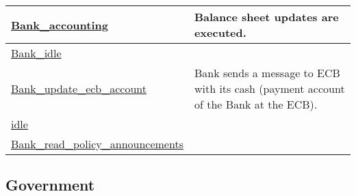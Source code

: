 \documentclass[a4paper,11pt]{article}
\begin{document}
\begin{landscape}
\begin{longtable}[H!]{ll}
\midrule
\url{Bank_accounting} \index{\url{Bank_accounting}} & \parbox{10cm}{Balance sheet updates are executed.} \\
\midrule
\url{Bank_idle}  & \parbox{10cm}{} \\
\midrule
\url{Bank_update_ecb_account}  & \parbox{10cm}{Bank sends a message to ECB with its cash (payment account of the Bank at the ECB).} \\
\midrule
\url{idle}  & \parbox{10cm}{} \\
\midrule
\url{Bank_read_policy_announcements}  & \parbox{10cm}{} \\
\end{longtable}
\end{landscape}



\clearpage
\subsection{Government}
\end{document}
